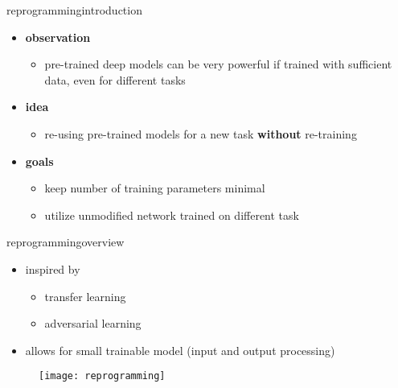  \begin{frame}{reprogramming}{introduction}
    \begin{itemize}
        \item   \textbf{observation}
            \begin{itemize}
                \item   pre-trained deep models can be very powerful if trained with sufficient data, even for different tasks
            \end{itemize}
        \bigskip
        \item   \textbf{idea}
            \begin{itemize}
                \item re-using pre-trained models for a new task \textbf{without} re-training
            \end{itemize}
        \bigskip
        \item<2->   \textbf{goals}
            \begin{itemize}
                \item   keep number of training parameters minimal
                \item   utilize unmodified network trained on different task
            \end{itemize}
    \end{itemize}
\end{frame}

\begin{frame}{reprogramming}{overview}
    \begin{itemize}
        \item   inspired by
            \begin{itemize}
                \item   transfer learning
                \item   adversarial learning
            \end{itemize}
        \item   allows for small trainable model (input and output processing)
    \end{itemize}
    \vspace{-2mm}
    \begin{figure}%
        \texttt{[image: reprogramming]}%
    \end{figure}
\end{frame}

